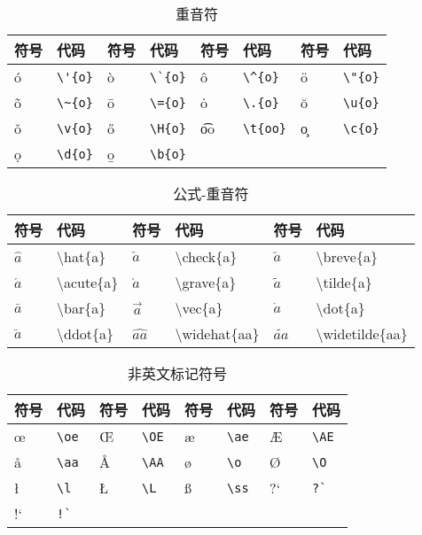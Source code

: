 \documentclass[UTF8,fontset=ubuntu]{ctexart}
\begin{document}
\begin{table}[H]
\begin{tabular}{l l l l l l l l}
	\hline
	符号 & 代码 & 符号 & 代码 & 符号 & 代码 & 符号 & 代码\\
	\hline
	\'{o} & \verb+\'{o}+ & \`{o} & \verb+\`{o}+ & \^{o} & \verb+\^{o}+ & \"{o} & \verb+\"{o}+\\
	\~{o} & \verb+\~{o}+ & \={o} & \verb+\={o}+ & \.{o} & \verb+\.{o}+ & \u{o} & \verb+\u{o}+\\
	\v{o} & \verb+\v{o}+ & \H{o} & \verb+\H{o}+ & \t{oo} & \verb+\t{oo}+ & \c{o} & \verb+\c{o}+\\
	\d{o} & \verb+\d{o}+ & \b{o} & \verb+\b{o}+\\
	\hline
\end{tabular}
\caption{重音符}
\end{table}

\begin{table}[H]
\begin{minipage}{\textwidth}
\begin{tabular}{l l l l l l}
	\hline
	符号 & 代码 & 符号 & 代码 & 符号 & 代码\\
	\hline
	$\hat{a}$ & \textbackslash  hat\{a\} & $\check{a}$ & \textbackslash  check\{a\} & $\breve{a}$ & \textbackslash  breve\{a\}\\
	$\acute{a}$ & \textbackslash  acute\{a\} & $\grave{a}$ & \textbackslash  grave\{a\} & $\tilde{a}$ & \textbackslash  tilde\{a\}\\
	$\bar{a}$ & \textbackslash  bar\{a\} & $\vec{a}$ & \textbackslash  vec\{a\} & $\dot{a}$ & \textbackslash  dot\{a\}\\
	 $\ddot{a}$ & \textbackslash  ddot\{a\} & $\widehat{aa}$ & \textbackslash  widehat\{aa\} & $\widetilde{aa}$ & \textbackslash  widetilde\{aa\}\\
	\hline
\end{tabular}
\end{minipage}
\caption{公式-重音符}
\end{table}

\begin{table}[H]
\begin{tabular}{l l l l l l l l}
	\hline
	符号 & 代码 & 符号 & 代码 & 符号 & 代码 & 符号 & 代码\\
	\hline
	\oe & \verb+\oe+ & \OE & \verb+\OE+ & \ae & \verb+\ae+ & \AE & \verb+\AE+\\
	\aa & \verb+\aa+ & \AA & \verb+\AA+ & \o & \verb+\o+ & \O & \verb+\O+\\
	\l & \verb+\l+ & \L & \verb+\L+ & \ss & \verb+\ss+ & ?` & \verb+?`+\\
	!` & \verb+!`+\\
	\hline
\end{tabular}
\caption{非英文标记符号}
\end{table}
\end{document}
